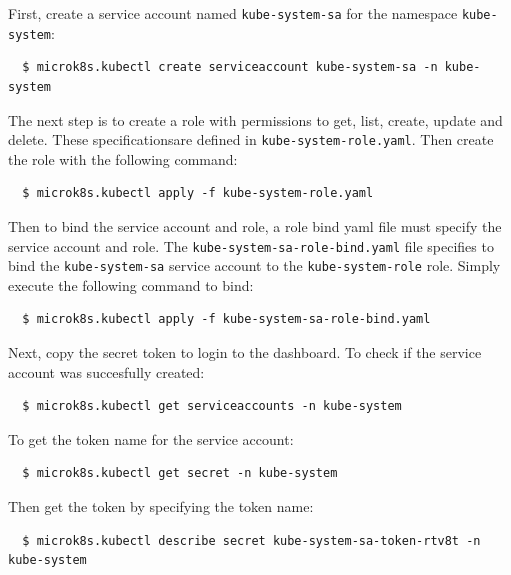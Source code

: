 \documentclass[11pt]{article}
\begin{document}
\noindent First, create a service account named \verb|kube-system-sa| for the namespace \verb|kube-system|:
\begin{verbatim}
  $ microk8s.kubectl create serviceaccount kube-system-sa -n kube-system
\end{verbatim}

The next step is to create a role with permissions to get, list, create, update and delete.
These specificationsare defined in \verb|kube-system-role.yaml|.
Then create the role with the following command:
\begin{verbatim}
  $ microk8s.kubectl apply -f kube-system-role.yaml
\end{verbatim}

Then to bind the service account and role, a role bind yaml file must specify the service account and role.
The \verb|kube-system-sa-role-bind.yaml| file specifies to bind the \verb|kube-system-sa| service account to the \verb|kube-system-role| role.
Simply execute the following command to bind:
\begin{verbatim}
  $ microk8s.kubectl apply -f kube-system-sa-role-bind.yaml
\end{verbatim}

Next, copy the secret token to login to the dashboard.
\noindent To check if the service account was succesfully created:
\begin{verbatim}
  $ microk8s.kubectl get serviceaccounts -n kube-system
\end{verbatim}

\noindent To get the token name for the service account:
\begin{verbatim}
  $ microk8s.kubectl get secret -n kube-system
\end{verbatim}

\noindent Then get the token by specifying the token name:
\begin{verbatim}
  $ microk8s.kubectl describe secret kube-system-sa-token-rtv8t -n kube-system
\end{verbatim}
\end{document}
